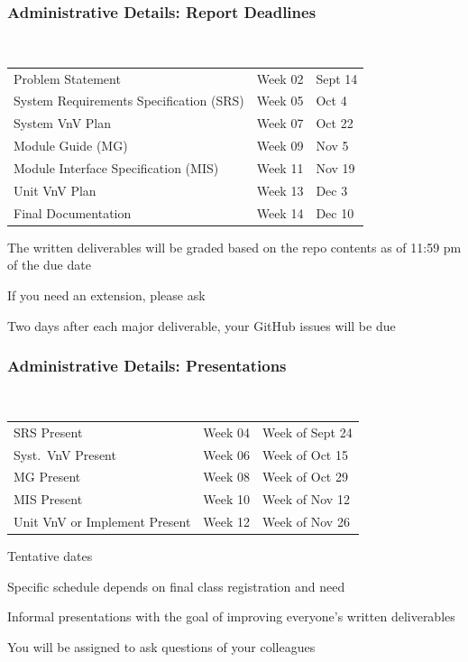\documentclass[t,12pt,numbers,fleqn]{beamer}
\begin{document}
\begin{frame}
\frametitle{Administrative Details: Report Deadlines}
~\newline
\begin{tabular}{l l l}
Problem Statement & Week 02 & Sept 14\\
System Requirements Specification (SRS) & Week 05 & Oct 4\\
System VnV Plan & Week 07 & Oct 22\\
Module Guide (MG) & Week 09 & Nov 5\\
Module Interface Specification (MIS) & Week 11 & Nov 19\\
Unit VnV Plan & Week 13 & Dec 3\\
Final Documentation & Week 14 & Dec 10\\
\end {tabular}

\bi
\item The written deliverables will be graded based on the repo contents as of
11:59 pm of the due date
\item If you need an extension, please ask
\item Two days after each major deliverable, your GitHub issues will be due
\ei

\end{frame}


\begin{frame}
\frametitle{Administrative Details: Presentations}

~\newline
\begin{tabular}{l l l}
SRS Present & Week 04 & Week of Sept 24\\
Syst.\ VnV Present & Week 06 & Week of Oct 15\\
MG Present & Week 08 & Week of Oct 29\\
MIS Present & Week 10 & Week of Nov 12\\
Unit VnV or Implement Present & Week 12 & Week of Nov 26\\
\end {tabular}

\bi
\item Tentative dates
\item Specific schedule depends on final class registration and need
\item Informal presentations with the goal of improving everyone's written
  deliverables
\item You will be assigned to ask questions of your colleagues
\ei

\end{frame}
\end{document}
